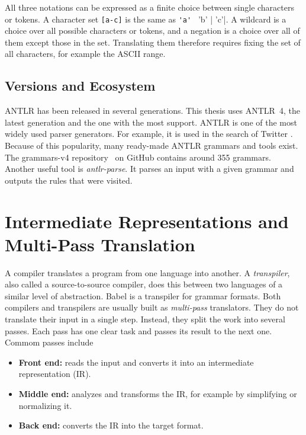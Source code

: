 \documentclass[thesis]{plai}
\begin{document}
All three notations can be expressed as a finite choice between single characters or tokens. A character set \verb|[a-c]| is the same as \verb|'a' | 'b' | 'c'|. A wildcard is a choice over all possible characters or tokens, and a negation is a choice over all of them except those in the set. Translating them therefore requires fixing the set of all characters, for example the ASCII range.

\subsection{Versions and Ecosystem}
ANTLR has been released in several generations. This thesis uses ANTLR~4, the latest generation and the one with the most support. ANTLR is one of the most widely used parser generators. For example, it is used in the search of Twitter \cite{antlr-website}. Because of this popularity, many ready-made ANTLR grammars and tools exist. The grammars-v4 repository~\cite{grammars-v4} on GitHub contains around 355 grammars. Another useful tool is \emph{antlr-parse}. It parses an input with a given grammar and outputs the rules that were visited.

\section{Intermediate Representations and Multi-Pass Translation}
\label{section:ir-multipass}
A compiler translates a program from one language into another. A \emph{transpiler}, also called a source-to-source compiler, does this between two languages of a similar level of abstraction. Babel is a transpiler for grammar formats. Both compilers and transpilers are usually built as \emph{multi-pass} translators. They do not translate their input in a single step. Instead, they split the work into several passes. Each pass has one clear task and passes its result to the next one. Commom passes include

\begin{itemize}
    \item \textbf{Front end:} reads the input and converts it into an intermediate representation (IR).
    \item \textbf{Middle end:} analyzes and transforms the IR, for example by simplifying or normalizing it. %
    \item \textbf{Back end:} converts the IR into the target format.
\end{itemize}
\end{document}
